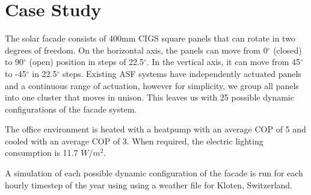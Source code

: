 	\section{Case Study}
		The solar facade consists of 400mm CIGS square panels that can rotate in two degrees of freedom. On the horizontal axis, the panels can move from 0$^{\circ}$ (closed) to 90$^{\circ}$ (open) position in steps of 22.5$^{\circ}$. In the vertical axis, it can move from 45$^{\circ}$ to -45$^{\circ}$ in 22.5$^{\circ}$ steps. Existing ASF systems \cite{nagy2015frontiers} have independently actuated panels and a continuous range of actuation, however for simplicity, we group all panels into one cluster that moves in unison. This leaves us with 25 possible dynamic configurations of the facade system. 

		The office environment is heated with a heatpump with an average COP of 5 and cooled with an average COP of 3. When required, the electric lighting consumption is 11.7 $W/m^2$. 

		A simulation of each possible dynamic configuration of the facade is run for each hourly timestep of the year using using a weather file for Kloten, Switzerland. %



